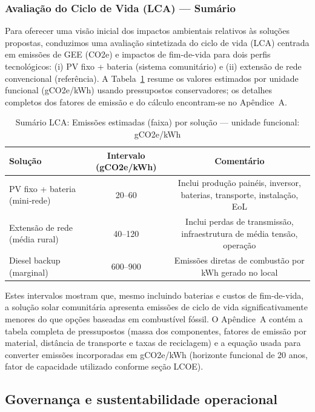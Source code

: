 \documentclass[12pt, a4paper]{article}
\begin{document}
\subsubsection{Avaliação do Ciclo de Vida (LCA) — Sumário}

Para oferecer uma visão inicial dos impactos ambientais relativos às soluções propostas, conduzimos
uma avaliação sintetizada do ciclo de vida (LCA) centrada em emissões de GEE (CO2e) e
impactos de fim-de-vida para dois perfis tecnológicos: (i) PV fixo + bateria (sistema comunitário)
e (ii) extensão de rede convencional (referência). A Tabela~\ref{tab:lca_summary} resume os
valores estimados por unidade funcional (gCO2e/kWh) usando pressupostos conservadores; os
detalhes completos dos fatores de emissão e do cálculo encontram-se no Apêndice~A.

\begin{table}[ht]
\centering
\caption{Sumário LCA: Emissões estimadas (faixa) por solução — unidade funcional: gCO2e/kWh}
\label{tab:lca_summary}
\begin{tabular}{lcc}
\toprule
\textbf{Solução} & \textbf{Intervalo (gCO2e/kWh)} & \textbf{Comentário} \\
\midrule
PV fixo + bateria (mini‑rede) & 20--60 & Inclui produção painéis, inversor, baterias, transporte, instalação, EoL \\
Extensão de rede (média rural) & 40--120 & Inclui perdas de transmissão, infraestrutura de média tensão, operação \\
Diesel backup (marginal) & 600--900 & Emissões diretas de combustão por kWh gerado no local \\
\bottomrule
\end{tabular}
\end{table}

Estes intervalos mostram que, mesmo incluindo baterias e custos de fim-de-vida, a solução
solar comunitária apresenta emissões de ciclo de vida significativamente menores do que
opções baseadas em combustível fóssil. O Apêndice~A contém a tabela completa de pressupostos
(massa dos componentes, fatores de emissão por material, distância de transporte e taxas de
reciclagem) e a equação usada para converter emissões incorporadas em gCO2e/kWh (horizonte
funcional de 20 anos, fator de capacidade utilizado conforme seção LCOE).


\subsection{Governança e sustentabilidade operacional}
\end{document}
